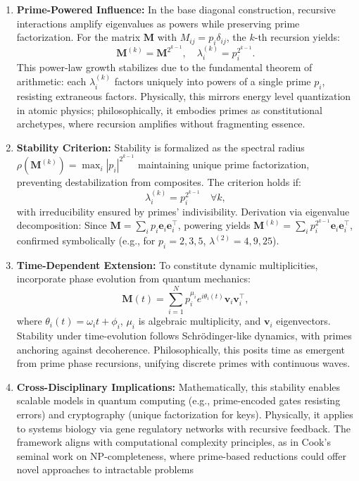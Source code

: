 \documentclass{article}
\theoremstyle{plain}
\begin{document}
\begin{enumerate}
\item \textbf{Prime-Powered Influence:} In the base diagonal construction, recursive interactions amplify eigenvalues as powers while preserving prime factorization. For the matrix $\mathbf{M}$ with $M_{ij} = p_i \delta_{ij}$, the $k$-th recursion yields:
\begin{equation}
\mathbf{M}^{(k)} = \mathbf{M}^{2^{k-1}}, \quad \lambda_i^{(k)} = p_i^{2^{k-1}}.
\end{equation}
This power-law growth stabilizes due to the fundamental theorem of arithmetic: each $\lambda_i^{(k)}$ factors uniquely into powers of a single prime $p_i$, resisting extraneous factors. Physically, this mirrors energy level quantization in atomic physics; philosophically, it embodies primes as constitutional archetypes, where recursion amplifies without fragmenting essence.
\item \textbf{Stability Criterion:} Stability is formalized as the spectral radius $\rho(\mathbf{M}^{(k)}) = \max_i |p_i|^{2^{k-1}}$ maintaining unique prime factorization, preventing destabilization from composites. The criterion holds if:
\begin{equation}
\lambda_i^{(k)} = p_i^{2^{k-1}} \quad \forall k,
\end{equation}
with irreducibility ensured by primes' indivisibility. Derivation via eigenvalue decomposition: Since $\mathbf{M} = \sum_i p_i \mathbf{e}_i \mathbf{e}_i^\top$, powering yields $\mathbf{M}^{(k)} = \sum_i p_i^{2^{k-1}} \mathbf{e}_i \mathbf{e}_i^\top$, confirmed symbolically (e.g., for $p_i = 2,3,5$, $\lambda^{(2)} = 4,9,25$).
\item \textbf{Time-Dependent Extension:} To constitute dynamic multiplicities, incorporate phase evolution from quantum mechanics:
\begin{equation}
\mathbf{M}(t) = \sum_{i=1}^N p_i^{\mu_i} e^{i \theta_i(t)} \mathbf{v}_i \mathbf{v}_i^\top,
\end{equation}
where $\theta_i(t) = \omega_i t + \phi_i$, $\mu_i$ is algebraic multiplicity, and $\mathbf{v}_i$ eigenvectors. Stability under time-evolution follows Schrödinger-like dynamics, with primes anchoring against decoherence. Philosophically, this posits time as emergent from prime phase recursions, unifying discrete primes with continuous waves.
\item \textbf{Cross-Disciplinary Implications:} Mathematically, this stability enables scalable models in quantum computing (e.g., prime-encoded gates resisting errors) and cryptography (unique factorization for keys). Physically, it applies to systems biology via gene regulatory networks with recursive feedback. The framework aligns with computational complexity principles, as in Cook's seminal work on NP-completeness, where prime-based reductions could offer novel approaches to intractable problems 


\end{enumerate}
\end{document}
